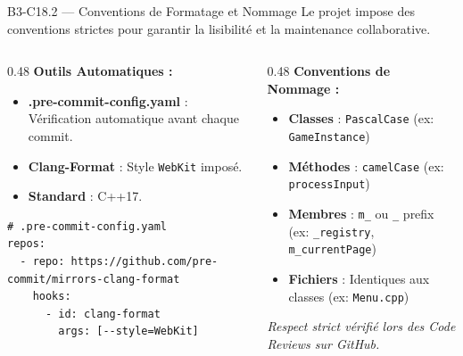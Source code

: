 \documentclass[aspectratio=169,10pt]{beamer}
\begin{document}
\begin{frame}[fragile]{B3-C18.2 — Conventions de Formatage et Nommage}
  \footnotesize
  Le projet impose des conventions strictes pour garantir la lisibilité et la maintenance collaborative.
  
  \begin{columns}[T]
    \begin{column}{0.48\textwidth}
      \textbf{Outils Automatiques :}
      \begin{itemize}
        \item \textbf{.pre-commit-config.yaml} : Vérification automatique avant chaque commit.
        \item \textbf{Clang-Format} : Style \texttt{WebKit} imposé.
        \item \textbf{Standard} : C++17.
      \end{itemize}
      
      \vspace{0.2em}
      \begin{lstlisting}
# .pre-commit-config.yaml
repos:
  - repo: https://github.com/pre-commit/mirrors-clang-format
    hooks:
      - id: clang-format
        args: [--style=WebKit]
      \end{lstlisting}
    \end{column}
    
    \begin{column}{0.48\textwidth}
      \textbf{Conventions de Nommage :}
      \begin{itemize}
        \item \textbf{Classes} : \texttt{PascalCase} (ex: \texttt{GameInstance})
        \item \textbf{Méthodes} : \texttt{camelCase} (ex: \texttt{processInput})
        \item \textbf{Membres} : \texttt{m\_} ou \texttt{\_} prefix (ex: \texttt{\_registry}, \texttt{m\_currentPage})
        \item \textbf{Fichiers} : Identiques aux classes (ex: \texttt{Menu.cpp})
      \end{itemize}
      
      \vspace{0.3em}
      \textit{Respect strict vérifié lors des Code Reviews sur GitHub.}
    \end{column}
  \end{columns}
\end{frame}
\end{document}
